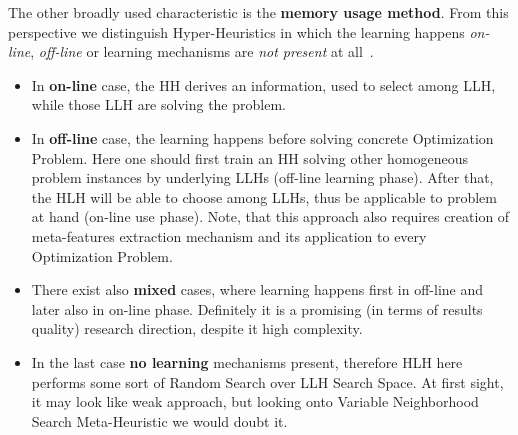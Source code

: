 The other broadly used characteristic is the \textbf{memory usage method}. 
From this perspective we distinguish Hyper-Heuristics in which the learning happens \textit{on-line}, \textit{off-line} or learning mechanisms are \textit{not present} at all~\cite{ryser2014review,burke2019classification}.
\begin{itemize}
	\item In \textbf{on-line} case, the HH derives an information, used to select among LLH, while those LLH are solving the problem.

	\item In \textbf{off-line} case, the learning happens before solving concrete Optimization Problem. Here one should first train an HH solving other homogeneous problem instances by underlying LLHs (off-line learning phase). After that, the HLH will be able to choose among LLHs, thus be applicable to problem at hand (on-line use phase). Note, that this approach also requires creation of meta-features extraction mechanism and its application to every Optimization Problem.

	\item There exist also \textbf{mixed} cases, where learning happens first in off-line and later also in on-line phase. Definitely it is a promising (in terms of results quality) research direction, despite it high complexity.
	
	\item In the last case \textbf{no learning} mechanisms present, therefore HLH here performs some sort of Random Search over LLH Search Space. At first sight, it may look like weak approach, but looking onto Variable Neighborhood Search Meta-Heuristic we would doubt it.
\end{itemize}



